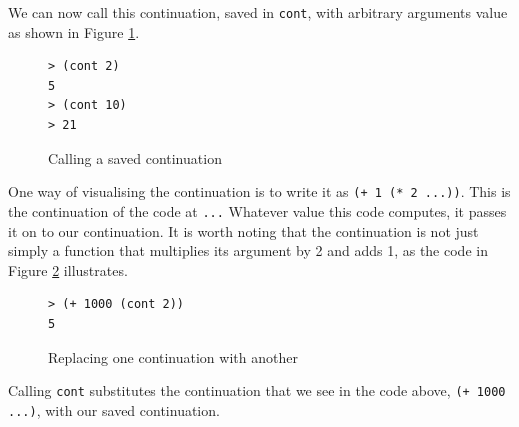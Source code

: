 \documentclass[11pt]{report}
\begin{document}
We can now call this continuation, saved in \texttt{cont}, with arbitrary arguments value as shown in Figure \ref{contcc3}.
\begin{figure}[ht]
\begin{lstlisting}
> (cont 2)
5
> (cont 10)
> 21
\end{lstlisting}
\caption{Calling a saved continuation}
\label{contcc3}
\end{figure}

One way of visualising the continuation is to write it as \texttt{(+ 1 (* 2 ...))}. This is the continuation of the code at \texttt{...} Whatever value this code computes, it passes it on to our continuation. It is worth noting that the continuation is not just simply a function that multiplies its argument by 2 and adds 1, as the code in Figure \ref{contcc4} illustrates.
\begin{figure}[ht]
\begin{lstlisting}
> (+ 1000 (cont 2))
5
\end{lstlisting}
\caption{Replacing one continuation with another}
\label{contcc4}
\end{figure}

Calling \texttt{cont} substitutes the continuation that we see in the code above, \texttt{(+ 1000 ...)}, with our saved continuation.
\end{document}

